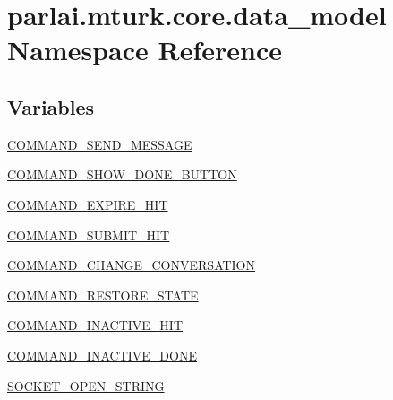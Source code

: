 \hypertarget{namespaceparlai_1_1mturk_1_1core_1_1data__model}{}\section{parlai.\+mturk.\+core.\+data\+\_\+model Namespace Reference}
\label{namespaceparlai_1_1mturk_1_1core_1_1data__model}
\subsection*{Variables}
\begin{DoxyCompactItemize}
\item 
\hyperlink{namespaceparlai_1_1mturk_1_1core_1_1data__model_a95deca2e9816f32647150e38feb9ffac}{C\+O\+M\+M\+A\+N\+D\+\_\+\+S\+E\+N\+D\+\_\+\+M\+E\+S\+S\+A\+GE}
\item 
\hyperlink{namespaceparlai_1_1mturk_1_1core_1_1data__model_ac50ffc2ceeb36f0da583b8fa76634b8f}{C\+O\+M\+M\+A\+N\+D\+\_\+\+S\+H\+O\+W\+\_\+\+D\+O\+N\+E\+\_\+\+B\+U\+T\+T\+ON}
\item 
\hyperlink{namespaceparlai_1_1mturk_1_1core_1_1data__model_a63e1c4a33861fa673ba46f83d95f8a81}{C\+O\+M\+M\+A\+N\+D\+\_\+\+E\+X\+P\+I\+R\+E\+\_\+\+H\+IT}
\item 
\hyperlink{namespaceparlai_1_1mturk_1_1core_1_1data__model_ac0ab1d8a0291e583d4ca6fb7ce9638dc}{C\+O\+M\+M\+A\+N\+D\+\_\+\+S\+U\+B\+M\+I\+T\+\_\+\+H\+IT}
\item 
\hyperlink{namespaceparlai_1_1mturk_1_1core_1_1data__model_aa299eda497bd5fc8e6b867e19264bfbf}{C\+O\+M\+M\+A\+N\+D\+\_\+\+C\+H\+A\+N\+G\+E\+\_\+\+C\+O\+N\+V\+E\+R\+S\+A\+T\+I\+ON}
\item 
\hyperlink{namespaceparlai_1_1mturk_1_1core_1_1data__model_a4b503a5ffaca35757bee4c785b3378d3}{C\+O\+M\+M\+A\+N\+D\+\_\+\+R\+E\+S\+T\+O\+R\+E\+\_\+\+S\+T\+A\+TE}
\item 
\hyperlink{namespaceparlai_1_1mturk_1_1core_1_1data__model_a1cbffadd3128315b6b9b57b2c10e5fd0}{C\+O\+M\+M\+A\+N\+D\+\_\+\+I\+N\+A\+C\+T\+I\+V\+E\+\_\+\+H\+IT}
\item 
\hyperlink{namespaceparlai_1_1mturk_1_1core_1_1data__model_a92b974e0c57fb20df263c5721794eea7}{C\+O\+M\+M\+A\+N\+D\+\_\+\+I\+N\+A\+C\+T\+I\+V\+E\+\_\+\+D\+O\+NE}
\item 
\hyperlink{namespaceparlai_1_1mturk_1_1core_1_1data__model_a90a33d8c864ed6ef16bd178ae544c551}{S\+O\+C\+K\+E\+T\+\_\+\+O\+P\+E\+N\+\_\+\+S\+T\+R\+I\+NG}
\item 

\end{DoxyCompactItemize}
